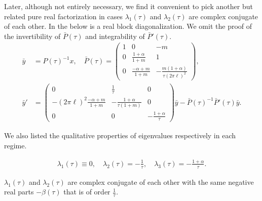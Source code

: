 \documentclass[a4paper,11pt]{article}
\def\l{(2\pi \ell)}
\def\k{(2\pi \ell)}
\theoremstyle{remark}
\begin{document}
Later, although not entirely necessary, we find it convenient to pick another but related pure real factorization in cases $\lambda_1(\tau)$ and $\lambda_2(\tau)$ are complex conjugate of each other. In the below is a real block diagonalization. We omit the proof of the invertibility of $\bar P(\tau)$ and integrability of $\bar P'(\tau)$.
\begin{equation}
\begin{aligned}
 \bar y &= P(\tau)^{-1} x, \quad \bar P(\tau) = \begin{pmatrix} 1 & 0 & -m\\0 & \frac{1+\alpha}{1+m} & 1\\0 & \frac{-\alpha+m}{1+m} & -\frac{m(1+\alpha)}{\tau\l^2}\end{pmatrix}, \\
 \bar y' &= \begin{pmatrix} 0 & \frac{1}{\tau} & 0\\-\l^2\frac{-\alpha+m}{1+m} & -\frac{1+\alpha}{\tau(1+m)} & 0\\0 & 0 & -\frac{1+\alpha}{\tau}\end{pmatrix} \bar y - \bar P(\tau)^{-1}\bar P'(\tau) \bar y. 
\end{aligned}\label{eq:block2}
\end{equation}

We also listed the qualitative properties of eigenvalues respectively in each regime.

\begin{align*}
 \lambda_1(\tau)\equiv 0, \quad \lambda_2(\tau)= -\frac{1}{\tau}, \quad \lambda_3(\tau) = -\frac{1+\alpha}{\tau}.
\end{align*}


$\lambda_1(\tau)$ and $\lambda_2(\tau)$ are complex conjugate of each other with the same negative real parts $-\beta(\tau)$ that is of order $\frac{1}{\tau}$.

\end{document}
